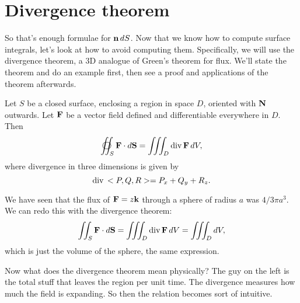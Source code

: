 \section{Divergence theorem}

So that's enough formulae for $\boldsymbol{\mathbf{n}} \, dS$. Now that we know how to compute surface integrals, let's look at how to avoid computing them. Specifically, we will use the divergence theorem, a 3D analogue of Green's theorem for flux. We'll state the theorem and do an example first, then see a proof and applications of the theorem afterwards.

Let $S$ be a closed surface, enclosing a region in space $D$, oriented with $\boldsymbol{\mathbf{N}}$ outwards. Let $\boldsymbol{\mathbf{F}}$ be a vector field defined and differentiable everywhere in $D$. Then
\[ \oiint_S \vF \cdot \vdS = \iiint_D \divg \vF\,dV, \]
where divergence in three dimensions is given by
\[ \mathrm{div}\, <P,Q,R> = P_x + Q_y + R_z. \]
\etm

\bex
We have seen that the flux of $\boldsymbol{\mathbf{F}} = z\boldsymbol{\mathbf{k}}$ through a sphere of radius $a$ was $4/3 \pi a^3$. We can redo this with the divergence theorem:
\[ \iint_S \boldsymbol{\mathbf{F}} \cdot d\boldsymbol{\mathbf{S}} = \iiint_D \mathrm{div}\, \boldsymbol{\mathbf{F}}\,dV = \iiint_D dV, \] 
which is just the volume of the sphere, the same expression.
\eex

\brm
Now what does the divergence theorem mean physically? The guy on the left is the total stuff that leaves the region per unit time. The divergence measures how much the field is expanding. So then the relation becomes sort of intuitive. 
\erm

